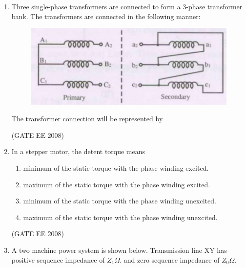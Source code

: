 \documentclass[journal,12pt,onecolumn]{IEEEtran}
\theoremstyle{remark}
\begin{document}
\begin{enumerate}[start=1, label=Q.\arabic*]
\item Three single-phase transformers are connected to form a 3-phase transformer bank. 
The transformers are connected in the following manner: 
\begin{figure}[H]
    \centering
    \includegraphics[width=\columnwidth]{Fig/q12.png}
    \caption{}
\end{figure}

The transformer connection will be represented by

\begin{enumerate}
\hfill (GATE EE 2008)
\end{enumerate}



\item In a stepper motor, the detent torque means
\begin{enumerate}
    \item minimum of the static torque with the phase winding excited.
    \item maximum of the static torque with the phase winding excited.
    \item minimum of the static torque with the phase winding unexcited.
    \item maximum of the static torque with the phase winding unexcited.
\end{enumerate}
\hfill (GATE EE 2008)



\item A two machine power system is shown below. Transmission line XY has positive sequence
impedance of $Z_1 \Omega.$ and zero sequence impedance of $Z_0 \Omega.$ 


\end{enumerate}
\end{document}
